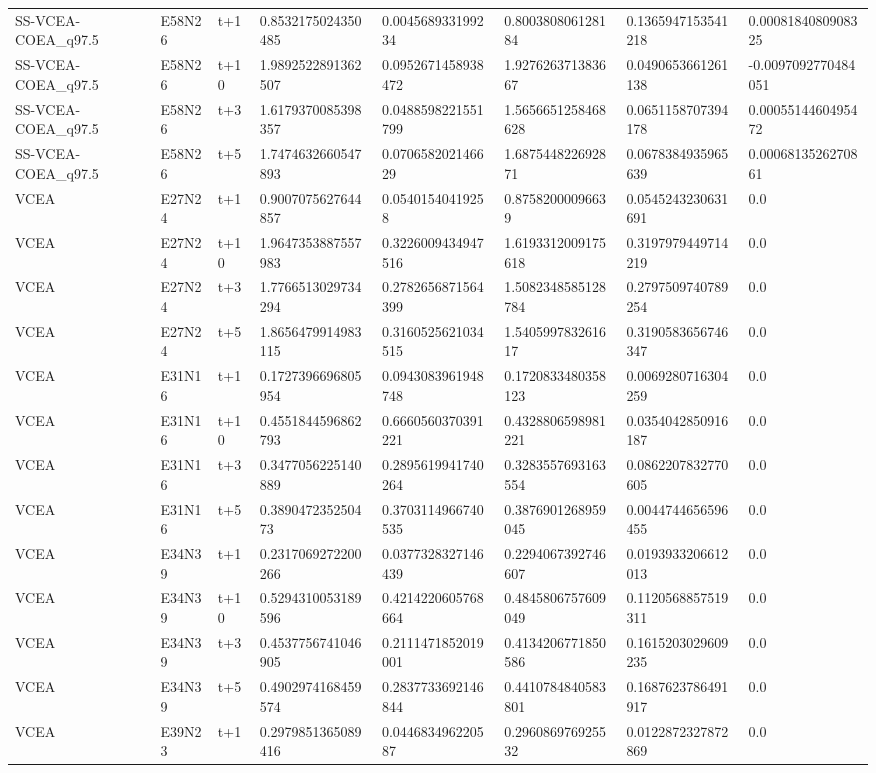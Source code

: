 \begin{landscape}
\begin{longtable}{llllllll}
SS-VCEA-COEA\_q97.5 & E58N26 & t+1 & 0.8532175024350485 & 0.004568933199234 & 0.800380806128184 & 0.1365947153541218 & 0.0008184080908325 \\
SS-VCEA-COEA\_q97.5 & E58N26 & t+10 & 1.9892522891362507 & 0.0952671458938472 & 1.927626371383667 & 0.0490653661261138 & -0.0097092770484051 \\
SS-VCEA-COEA\_q97.5 & E58N26 & t+3 & 1.6179370085398357 & 0.0488598221551799 & 1.5656651258468628 & 0.0651158707394178 & 0.0005514460495472 \\
SS-VCEA-COEA\_q97.5 & E58N26 & t+5 & 1.7474632660547893 & 0.070658202146629 & 1.687544822692871 & 0.0678384935965639 & 0.0006813526270861 \\
VCEA & E27N24 & t+1 & 0.9007075627644857 & 0.05401540419258 & 0.87582000096639 & 0.0545243230631691 & 0.0 \\
VCEA & E27N24 & t+10 & 1.9647353887557983 & 0.3226009434947516 & 1.6193312009175618 & 0.3197979449714219 & 0.0 \\
VCEA & E27N24 & t+3 & 1.7766513029734294 & 0.2782656871564399 & 1.5082348585128784 & 0.2797509740789254 & 0.0 \\
VCEA & E27N24 & t+5 & 1.8656479914983115 & 0.3160525621034515 & 1.540599783261617 & 0.3190583656746347 & 0.0 \\
VCEA & E31N16 & t+1 & 0.1727396696805954 & 0.0943083961948748 & 0.1720833480358123 & 0.0069280716304259 & 0.0 \\
VCEA & E31N16 & t+10 & 0.4551844596862793 & 0.6660560370391221 & 0.4328806598981221 & 0.0354042850916187 & 0.0 \\
VCEA & E31N16 & t+3 & 0.3477056225140889 & 0.2895619941740264 & 0.3283557693163554 & 0.0862207832770605 & 0.0 \\
VCEA & E31N16 & t+5 & 0.389047235250473 & 0.3703114966740535 & 0.3876901268959045 & 0.0044744656596455 & 0.0 \\
VCEA & E34N39 & t+1 & 0.2317069272200266 & 0.0377328327146439 & 0.2294067392746607 & 0.0193933206612013 & 0.0 \\
VCEA & E34N39 & t+10 & 0.5294310053189596 & 0.4214220605768664 & 0.4845806757609049 & 0.1120568857519311 & 0.0 \\
VCEA & E34N39 & t+3 & 0.4537756741046905 & 0.2111471852019001 & 0.4134206771850586 & 0.1615203029609235 & 0.0 \\
VCEA & E34N39 & t+5 & 0.4902974168459574 & 0.2837733692146844 & 0.4410784840583801 & 0.1687623786491917 & 0.0 \\
VCEA & E39N23 & t+1 & 0.2979851365089416 & 0.044683496220587 & 0.296086976925532 & 0.0122872327872869 & 0.0 \\

\end{longtable}
\end{landscape}
